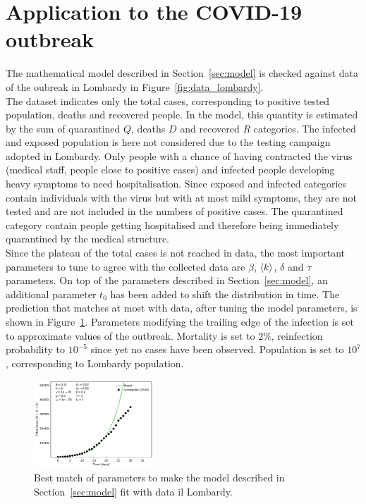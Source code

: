 \section{Application to the COVID-19 outbreak}
\label{sec:covid}

The mathematical model described in Section~\ref{sec:model} is checked against data of the oubreak in Lombardy in  Figure~\ref{fig:data_lombardy}. \\

The dataset indicates only the total cases, corresponding to positive tested population, deaths and recovered people. In the model, this quantity is estimated by the sum of quarantined $Q$, deaths $D$ and recovered $R$ categories. The infected and exposed population is here not considered due to the testing campaign adopted in Lombardy. Only people with a chance of having contracted the virus (medical staff, people close to positive cases) and infected people developing heavy symptoms to need hospitalisation. Since exposed and infected categories contain individuals with the virus but with at most mild symptoms, they are not tested and are not included in the numbers of  positive  cases. The quarantined category contain people getting hospitalised and therefore being immediately quarantined by the medical structure. \\

Since the plateau of the total cases is not reached in data, the most important parameters to tune to agree with the collected data are $\beta$, $\braket{k}$, $\delta$ and $\tau$ parameters. On top of the parameters described in Section~\ref{sec:model}, an additional parameter $t_0$ has been added to shift the distribution in time. The  prediction that matches at most with data, after tuning the model parameters, is shown in Figure~\ref{fig:data_vs_model_first_lombardy}. Parameters modifying the trailing edge of the infection is set to approximate values of the outbreak. Mortality is set to $2\%$, reinfection probability to $10^{-5}$ since yet no cases have been observed. Population is set to $10^7$, corresponding to Lombardy population.\\

\begin{figure}
\centering
  \includegraphics[width=0.4\textwidth]{imgs/Covid/DataVsModel_parameters_Lombardia_less_impacting.pdf}
  \caption{Best match of parameters to make the model described in Section~\ref{sec:model} fit with data il Lombardy.}
  \label{fig:data_vs_model_first_lombardy}
\end{figure}

